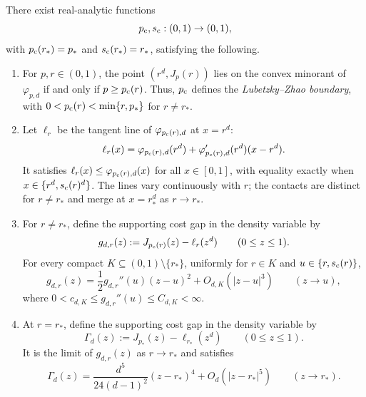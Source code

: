 \begin{theorem}\label{thm:lz-boundary}
There exist real-analytic functions
\[
  \pc,\sc:(0,1)\to(0,1),
\]
with $\pc(r_*)=p_*$ and
$\sc(r_*)=r_*$, satisfying the following.
\begin{enumerate}[label=(M\arabic*)]
  \item 
  For $p,r\in(0,1)$, the point $(r^d,J_p(r))$ lies on the convex minorant
  of $\varphi_{p,d}$ if and only if $p\ge\pc(r)$.
  Thus, $\pc$ defines the \emph{Lubetzky--Zhao boundary}, with
  $0<\pc(r)<\min\{r,p_*\}$ for $r\ne r_*$.

  \item
  Let $\ell_r$ be the tangent line of $\varphi_{\pc(r),d}$ at $x=r^d$:
  \[
    \ell_r(x)=\varphi_{\pc(r),d}(r^d)
      +\varphi_{\pc(r),d}'(r^d)(x-r^d).
  \]
  It satisfies $\ell_r(x)\le\varphi_{\pc(r),d}(x)$ for all $x\in[0,1]$,
  with equality exactly when $x\in\{r^d,\sc(r)^d\}$.
  The lines vary continuously with $r$; the contacts are distinct for
  $r\ne r_*$ and merge at $x=r_*^d$ as $r\to r_*$.

  \item
  For $r\ne r_*$, define the supporting cost gap in the density variable by
  \begin{equation}\label{eq:supporting-cost-gap}
    g_{d,r}(z):=J_{\pc(r)}(z)-\ell_r(z^d)
    \qquad(0\le z\le1).
  \end{equation}
  For every compact $K\subseteq(0,1)\setminus\{r_*\}$, uniformly for
  $r\in K$ and $u\in\{r,\sc(r)\}$,
  \begin{equation}\label{eq:contact-gap-expansion}
    g_{d,r}(z)=\frac12g_{d,r}''(u)(z-u)^2+O_{d,K}(|z-u|^3)
    \qquad(z\to u),
  \end{equation}
  where $0<c_{d,K}\le g_{d,r}''(u)\le C_{d,K}<\infty$.

  \item
  At $r=r_*$, define the supporting cost gap in the density variable by
  \begin{equation}\label{eq:endpoint-supporting-gap}
    \Gamma_d(z):=J_{p_*}(z)-\ell_{r_*}(z^d)
    \qquad(0\le z\le1).
  \end{equation}
  It is the limit of $g_{d,r}(z)$ as $r\to r_*$ and satisfies
  \begin{equation}\label{eq:endpoint-gap-expansion}
    \Gamma_d(z)=\frac{d^5}{24(d-1)^2}(z-r_*)^4
      +O_d(|z-r_*|^5)
    \qquad(z\to r_*).
  \end{equation}
\end{enumerate}
\end{theorem}

